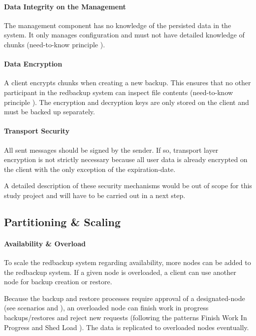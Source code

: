 \paragraph{Data Integrity on the Management} The \gls{management} component has no knowledge of the persisted data in the system. It only manages configuration and must not have detailed knowledge of \glspl{chunk} (need-to-know principle \cite{security-patterns}).

\paragraph{Data Encryption} A \gls{client} encrypts \glspl{chunk} when creating a new backup. This ensures that no other participant in the redbackup system can inspect file contents (need-to-know principle \cite{security-patterns}). The encryption and decryption keys are only stored on the \gls{client} and must be backed up separately.

\paragraph{Transport Security} All sent \glspl{message} should be signed by the sender. If so, transport layer encryption is not strictly necessary because all user data is already encrypted on the \gls{client} with the only exception of the \gls{expiration-date}.
\\
\vspace{1em}

\noindent A detailed description of these security mechanisms would be out of scope for this study project and will have to be carried out in a next step.

\subsection{Partitioning \& Scaling}

\paragraph{Availability \& Overload} To scale the redbackup system regarding availability, more \glspl{node} can be added to the redbackup system. If a given \gls{node} is overloaded, a \gls{client} can use another \gls{node} for backup creation or restore.

Because the backup and restore processes require approval of a \gls{designated-node} (see scenarios  and ), an overloaded \gls{node} can finish work in progress backups/restores and reject new requests (following the patterns Finish Work In Progress and Shed Load \cite{fault-tolerance}). The data is replicated to overloaded \glspl{node} eventually.

